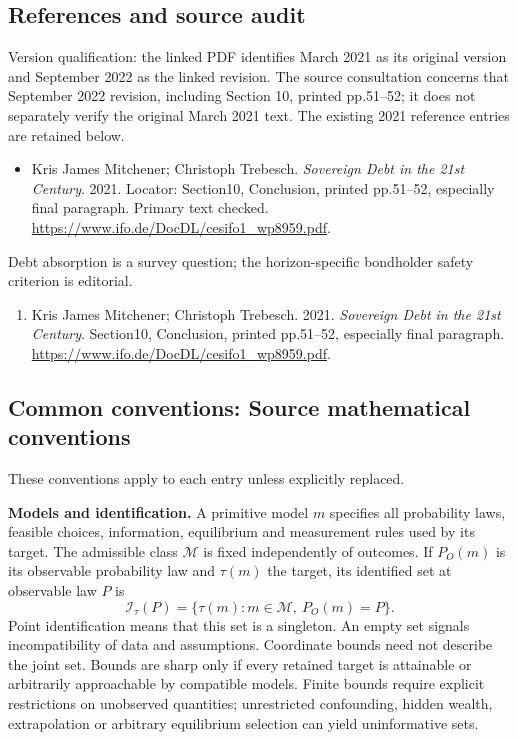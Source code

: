 \documentclass[11pt,a4paper]{article}
\begin{document}
\subsection*{References and source audit}
Version qualification: the linked PDF identifies March 2021 as its original version and September 2022 as the linked revision. The source consultation concerns that September 2022 revision, including Section 10, printed pp.51--52; it does not separately verify the original March 2021 text. The existing 2021 reference entries are retained below.
\begin{itemize}
\item Kris James Mitchener; Christoph Trebesch. \emph{Sovereign Debt in the 21st Century}. 2021. Locator: Section10, Conclusion, printed pp.51--52, especially final paragraph. Primary text checked. \url{https://www.ifo.de/DocDL/cesifo1_wp8959.pdf}.
\end{itemize}
Debt absorption is a survey question; the horizon-specific bondholder safety criterion is editorial.
\begin{enumerate}\raggedright
\item\hypertarget{definitions:source:30007535:1}{} Kris James Mitchener; Christoph Trebesch. 2021. \emph{Sovereign Debt in the 21st Century}. Section10, Conclusion, printed pp.51--52, especially final paragraph.
\url{https://www.ifo.de/DocDL/cesifo1_wp8959.pdf}.
\end{enumerate}

\subsection*{Common conventions: Source mathematical conventions}

These conventions apply to each entry unless explicitly replaced.

\textbf{Models and identification.} A primitive model \(m\) specifies all probability laws, feasible choices, information, equilibrium and measurement rules used by its target. The admissible class \(\mathcal M\) is fixed independently of outcomes. If \(P_O(m)\) is its observable probability law and \(\tau(m)\) the target, its identified set at observable law \(P\) is
\[
 \mathcal I_\tau(P)=\{\tau(m):m\in\mathcal M,\ P_O(m)=P\}.
\]
Point identification means that this set is a singleton. An empty set signals incompatibility of data and assumptions. Coordinate bounds need not describe the joint set. Bounds are sharp only if every retained target is attainable or arbitrarily approachable by compatible models. Finite bounds require explicit restrictions on unobserved quantities; unrestricted confounding, hidden wealth, extrapolation or arbitrary equilibrium selection can yield uninformative sets.
\end{document}
